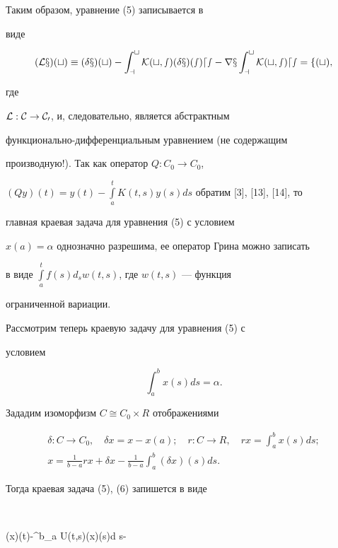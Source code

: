 Таким образом, уравнение (5) записывается в 


виде 


$$ 


(\cal L x)(t)\equiv(\delta x)(t)-\int^t_a 


K(t,s)(\delta x)(s)d s-r x\int^t_a K(t,s)d s=f(t),


$$ 


где 


$\cal L:C\to C_0$, и, следовательно, является абстрактным  


функционально-дифференциальным уравнением (не содержащим  


производную!). Так как оператор $Q:C_0\to C_0$, 


$(Q y)(t)=y(t)-\int\limits^t_a K(t,s)y(s)d s$ обратим [3], [13], [14], то 


главная краевая задача для уравнения (5) с условием  


$x(a)=\alpha$ однозначно разрешима, ее оператор Грина можно записать  


в виде $\int\limits^t_a f(s)d_s w(t,s)$, где $w(t,s)$ --- функция 


ограниченной вариации. 


 


Рассмотрим теперь краевую задачу для уравнения (5) с  


условием 


\begin{equation} 


\int^b_a x(s)d s=\alpha .


\end{equation} 


Зададим изоморфизм $C\cong C_0\times R$ отображениями 


\begin{gather*} 


\delta:C\to C_0,\quad \delta x=x-x(a);\quad 


r:C\to R,\quad r x=\int^b_a x(s)d s;\\ 


x=\frac{1}{b-a}r x+\delta x-\frac{1}{b-a} 


\int^b_a(\delta x)(s)d s. 


\end{gather*} 


Тогда краевая задача (5), (6) запишется в виде 


$$ 


(\delta x)(t)-\int^b_a U(t,s)(\delta x)(s)d s- 


